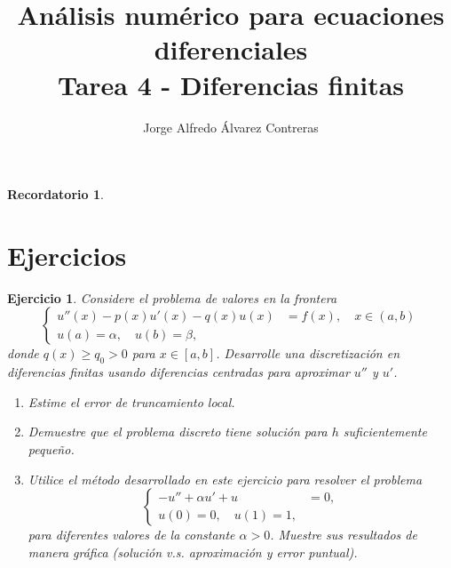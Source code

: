 \documentclass[11pt]{article}
\title{Análisis numérico para ecuaciones diferenciales \\
Tarea 4 - Diferencias finitas}
\author{Jorge Alfredo Álvarez Contreras}
\newtheorem{reminder}{Recordatorio}
\newtheorem{exercise}{Ejercicio}
\begin{document}
\maketitle

\begin{reminder}
\end{reminder}

\section*{Ejercicios}

\begin{exercise}
  Considere el problema de valores en la frontera
  \begin{equation}
    \left\{
      \begin{aligned}
        u''(x) - p(x)u'(x) - q(x)u(x) &= f(x), \quad x\in(a,b)
        \\
        u(a) = \alpha, \quad u(b)=\beta, &
      \end{aligned}
    \right.
  \end{equation}
  donde $q(x)\geq q_0>0$ para $x\in[a,b]$. Desarrolle una
  discretización en diferencias finitas usando diferencias centradas
  para aproximar $u''$ y $u'$.
  \begin{enumerate}
    \item
      Estime el error de truncamiento local.
    \item
      Demuestre que el problema discreto tiene solución para $h$ 
      suficientemente pequeño.
    \item
      Utilice el método desarrollado en este ejercicio para resolver
      el problema
      \begin{equation}
        \left\{
          \begin{aligned}
            -u'' + \alpha u' + u &= 0,
            \\
            u(0) = 0,\quad u(1)=1,
          \end{aligned}
        \right.
      \end{equation}
      para diferentes valores de la constante $\alpha>0$. Muestre sus
      resultados de manera gráfica (solución v.s. aproximación y error
      puntual).
  \end{enumerate}
\end{exercise}
\end{document}
